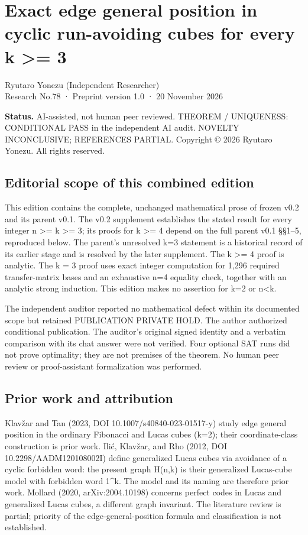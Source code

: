 \documentclass[
  10pt,
]{article}
\author{}
\date{}
\begin{document}
\section{Exact edge general position in cyclic run-avoiding cubes for
every k \textgreater=
3}\label{exact-edge-general-position-in-cyclic-run-avoiding-cubes-for-every-k-3}

Ryutaro Yonezu (Independent Researcher)\\
Research No.78 · Preprint version 1.0 · 20 November 2026

\textbf{Status.} AI-assisted, not human peer reviewed. THEOREM /
UNIQUENESS: CONDITIONAL PASS in the independent AI audit. NOVELTY
INCONCLUSIVE; REFERENCES PARTIAL. Copyright © 2026 Ryutaro Yonezu. All
rights reserved.

\subsection{Editorial scope of this combined
edition}\label{editorial-scope-of-this-combined-edition}

This edition contains the complete, unchanged mathematical prose of
frozen v0.2 and its parent v0.1. The v0.2 supplement establishes the
stated result for every integer n \textgreater= k \textgreater= 3; its
proofs for k \textgreater= 4 depend on the full parent v0.1 §§1--5,
reproduced below. The parent's unresolved k=3 statement is a historical
record of its earlier stage and is resolved by the later supplement. The
k \textgreater= 4 proof is analytic. The k = 3 proof uses exact integer
computation for 1,296 required transfer-matrix bases and an exhaustive
n=4 equality check, together with an analytic strong induction. This
edition makes no assertion for k=2 or n\textless k.

The independent auditor reported no mathematical defect within its
documented scope but retained PUBLICATION PRIVATE HOLD. The author
authorized conditional publication. The auditor's original signed
identity and a verbatim comparison with its chat answer were not
verified. Four optional SAT runs did not prove optimality; they are not
premises of the theorem. No human peer review or proof-assistant
formalization was performed.

\subsection{Prior work and
attribution}\label{prior-work-and-attribution}

Klavžar and Tan (2023, DOI 10.1007/s40840-023-01517-y) study edge
general position in the ordinary Fibonacci and Lucas cubes (k=2); their
coordinate-class construction is prior work. Ilić, Klavžar, and Rho
(2012, DOI 10.2298/AADM120108002I) define generalized Lucas cubes via
avoidance of a cyclic forbidden word: the present graph H(n,k) is their
generalized Lucas-cube model with forbidden word 1\^{}k. The model and
its naming are therefore prior work. Mollard (2020, arXiv:2004.10198)
concerns perfect codes in Lucas and generalized Lucas cubes, a different
graph invariant. The literature review is partial; priority of the
edge-general-position formula and classification is not established.
\end{document}

